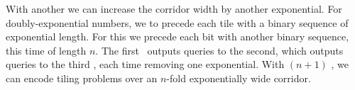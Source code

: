 {With another \FFT we can increase the corridor width by another exponential.
For doubly-exponential numbers, we to precede each tile with a binary sequence of exponential length.
For this we precede each bit with another binary sequence, this time of length $n$.
The first \FFT\ outputs queries to the second, which outputs queries to the third \FFT, each time removing one exponential.
With $(n+1)$ \FFT, we can encode tiling problems over an $n$-fold exponentially wide corridor.
}









